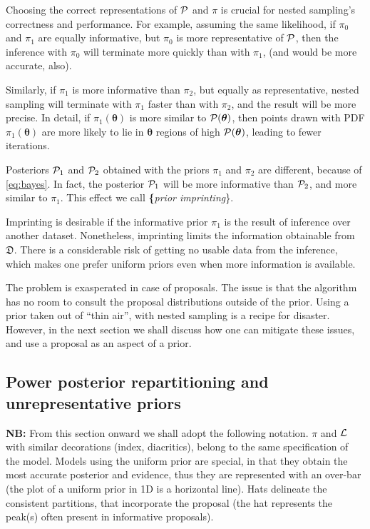 \documentclass[draft,usenatbib]{mnras}
\begin{document}
Choosing the correct representations of \({\cal P}\) and \(\pi\) is
crucial for nested sampling's correctness and performance. For
example, assuming the same likelihood, if \(\pi_{0}\) and \(\pi_{1}\)
are equally informative, but \(\pi_{0}\) is more representative of
\({\cal P}\), then the inference with \(\pi_{0}\) will terminate more
quickly than with \(\pi_{1}\), (and would be more accurate, also).

Similarly, if \(\pi_{1}\) is more informative than \(\pi_{2}\), but
equally as representative, nested sampling will terminate with
\(\pi_{1}\) faster than with \(\pi_{2}\), and the result will be more
precise. In detail, if \(\pi_{1} (\bm{\theta})\) is more similar to
\({\cal P} (\bm{\theta})\), then points drawn with PDF \(\pi_{1}
   (\bm{\theta})\) are more likely to lie in \(\bm{\theta}\) regions of
high \({\cal P} (\bm{\theta})\), leading to fewer iterations.

Posteriors \({\cal P}_{1}\) and \({\cal P}_{2}\) obtained with the
priors \(\pi_{1}\) and \(\pi_{2}\) are different, because of
\cref{eq:bayes}. In fact, the posterior \({\cal P}_{1}\) will be more
informative than \({\cal P}_{2}\), and more similar to
\(\pi_{1}\). This effect we call \textbf\{\emph{prior imprinting}\}.

Imprinting is desirable if the informative prior \(\pi_{1}\) is the
result of inference over another dataset. Nonetheless, imprinting
limits the information obtainable from \(\mathfrak{D}\). There is a
considerable risk of getting no usable data from the inference,
which makes one prefer uniform priors even when more information is
available.

The problem is exasperated in case of proposals. The issue is that
the algorithm has no room to consult the proposal distributions
outside of the prior. Using a prior taken out of ``thin air'', with
nested sampling is a recipe for disaster. However, in the next
section we shall discuss how one can mitigate these issues, and use
a proposal as an aspect of a prior.


\subsection{Power posterior repartitioning and unrepresentative priors}
\label{sec:orgd933e18}
\textbf{NB:} From this section onward we shall adopt the following
notation. \(\pi\) and \({\cal L}\) with similar decorations (index,
diacritics), belong to the same specification of the model. Models
using the uniform prior are special, in that they obtain the most
accurate posterior and evidence, thus they are represented with an
over-bar (the plot of a uniform prior in 1D is a horizontal
line). Hats delineate the consistent partitions, that incorporate
the proposal (the hat represents the peak(s) often present in
informative proposals).
\end{document}
